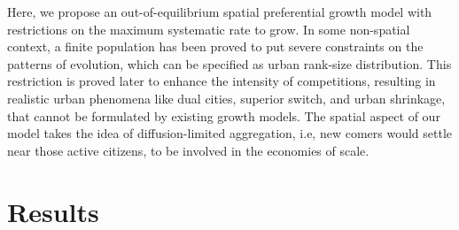 \documentclass[reprint,unsortedaddress,amsmath,amssymb,aps,prl,showkeys]{revtex4-2}
\begin{document}
Here, we propose an out-of-equilibrium spatial preferential growth model with restrictions on the maximum systematic rate to grow. In some non-spatial context\cite{PhysRevE.55.R3817}, a finite population has been proved to put severe constraints on the patterns of  evolution, which can be specified as urban rank-size distribution. This restriction is proved later to enhance the intensity of competitions, resulting in realistic urban phenomena like dual cities\cite{silverman2018rethinking}, superior switch\cite{gabaix2004evolution}, and urban shrinkage\cite{haase2014conceptualizing}, that cannot be formulated by existing growth models. The spatial aspect of our model takes the idea of diffusion-limited aggregation\cite{makse1995modelling, rybski2013distance,kleinberg2000navigation}, i.e, new comers would settle near those active citizens, to be involved in the economies of scale.

\section{Results}
\end{document}
